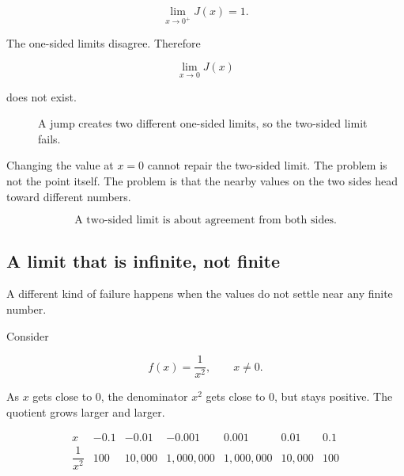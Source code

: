 \[
\lim_{x\to0^+}J(x)=1.
\]

The one-sided limits disagree.  Therefore

\[
\lim_{x\to0}J(x)
\]

does not exist.

\begin{figure}[h]
\centering
{}
\caption{A jump creates two different one-sided limits, so the two-sided limit fails.}
\label{fig:jump-warning-no-limit}
\end{figure}

Changing the value at \(x=0\) cannot repair the two-sided limit.  The problem is not the point itself.  The problem is that the nearby values on the two sides head toward different numbers.

\[
\boxed{\text{A two-sided limit is about agreement from both sides.}}
\]

\subsection{A limit that is infinite, not finite}
\label{subsec:infinite-not-finite-warning}

A different kind of failure happens when the values do not settle near any finite number.

Consider

\[
f(x)=\frac{1}{x^2},
\qquad x\neq0.
\]

As \(x\) gets close to \(0\), the denominator \(x^2\) gets close to \(0\), but stays positive.  The quotient grows larger and larger.

\[
\begin{array}{c|cccccc}
x & -0.1 & -0.01 & -0.001 & 0.001 & 0.01 & 0.1 \\ \hline
\dfrac1{x^2} & 100 & 10{,}000 & 1{,}000{,}000
& 1{,}000{,}000 & 10{,}000 & 100
\end{array}
\]

